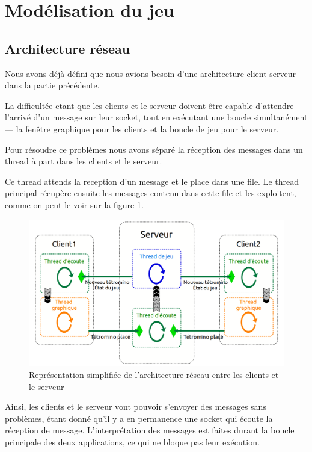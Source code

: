 \documentclass[a4paper, 12pt]{article}
\begin{document}
	\section{Modélisation du jeu}

		\subsection{Architecture réseau}

			Nous avons déjà défini que nous avions besoin d'une architecture client-serveur dans la partie précédente.

			La difficultée etant que les clients et le serveur doivent être capable d'attendre l'arrivé d'un message sur leur socket, tout en exécutant une boucle simultanément --- la fenêtre graphique pour les clients et la boucle de jeu pour le serveur.


			Pour résoudre ce problèmes nous avons séparé la réception des messages dans un thread à part dans les clients et le serveur.

			Ce thread attends la reception d'un message et le place dans une file. Le thread principal récupère ensuite les messages contenu dans cette file et les exploitent, comme on peut le voir sur la figure \ref{fig:rezo}.

			\begin{figure}[bt]
				\centering
				\includegraphics[scale=0.3]{img/archi_reseau.png}
				\caption{Représentation simplifiée de l'architecture réseau entre les clients et le serveur}
				\label{fig:rezo}
			\end{figure}

			Ainsi, les clients et le serveur vont pouvoir s'envoyer des messages sans problèmes, étant donné qu'il y a en permanence une socket qui écoute la réception de message. L'interprétation des messages est faites durant la boucle principale des deux applications, ce qui ne bloque pas leur exécution.
\end{document}
